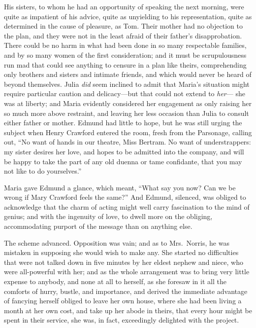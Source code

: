 \documentclass{article}
\begin{document}
His sisters, to whom he had an opportunity of speaking
the next morning, were quite as impatient of his advice,
quite as unyielding to his representation, quite as determined
in the cause of pleasure, as Tom.  Their mother had no
objection to the plan, and they were not in the least afraid
of their father's disapprobation.  There could be no harm
in what had been done in so many respectable families,
and by so many women of the first consideration; and it
must be scrupulousness run mad that could see anything to
censure in a plan like theirs, comprehending only brothers
and sisters and intimate friends, and which would never
be heard of beyond themselves.  Julia \emph{did} seem inclined
to admit that Maria's situation might require particular
caution and delicacy---but that could not extend to \emph{her}---%
she was at liberty; and Maria evidently considered her
engagement as only raising her so much more above restraint,
and leaving her less occasion than Julia to consult
either father or mother.  Edmund had little to hope,
but he was still urging the subject when Henry Crawford
entered the room, fresh from the Parsonage, calling out,
``No want of hands in our theatre, Miss Bertram.
No want of understrappers:  my sister desires her love,
and hopes to be admitted into the company, and will be happy
to take the part of any old duenna or tame confidante,
that you may not like to do yourselves.''

Maria gave Edmund a glance, which meant, ``What say you now?
Can we be wrong if Mary Crawford feels the same?''
And Edmund, silenced, was obliged to acknowledge that the
charm of acting might well carry fascination to the mind
of genius; and with the ingenuity of love, to dwell more
on the obliging, accommodating purport of the message
than on anything else.

The scheme advanced.  Opposition was vain; and as to
Mrs.\ Norris, he was mistaken in supposing she would wish
to make any.  She started no difficulties that were
not talked down in five minutes by her eldest nephew
and niece, who were all-powerful with her; and as the
whole arrangement was to bring very little expense
to anybody, and none at all to herself, as she foresaw
in it all the comforts of hurry, bustle, and importance,
and derived the immediate advantage of fancying herself
obliged to leave her own house, where she had been living
a month at her own cost, and take up her abode in theirs,
that every hour might be spent in their service, she was,
in fact, exceedingly delighted with the project.
\end{document}
